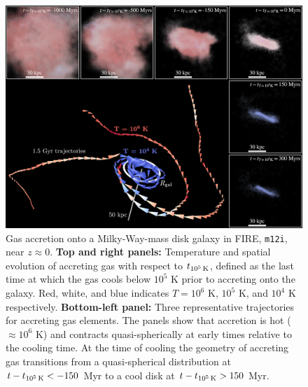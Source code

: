 \documentclass[fleqn,usenatbib]{mnras}
\newcommand{\tcon}{t_{10^5\,{\rm K}}}
\begin{document}
\begin{figure}
    \centering
    \includegraphics[width=\textwidth]{figures/illustrative_tracks/illustrative_tracks.png}
    \caption{
Gas accretion onto a Milky-Way-mass disk galaxy in FIRE, \texttt{m12i}, near $z\approx0$.
\textbf{Top and right panels:}
Temperature and spatial evolution of accreting gas with respect to $\tcon$, defined as the last time at which the gas cools below $10^5$ K prior to accreting onto the galaxy.
Red, white, and blue indicates $T=10^6$ K, $10^5$ K, and $10^4$ K respectively. 
\textbf{Bottom-left panel:}
Three representative trajectories for accreting gas elements.
The panels show that accretion is hot ($\approx 10^6$ K) and contracts quasi-spherically at early times relative to the cooling time.
At the time of cooling the geometry of accreting gas transitions from a quasi-spherical distribution at $t-\tcon < -150$ Myr to a cool disk at $t-\tcon > 150$ Myr.
    }
    \label{f: overview}
\end{figure}
\end{document}
